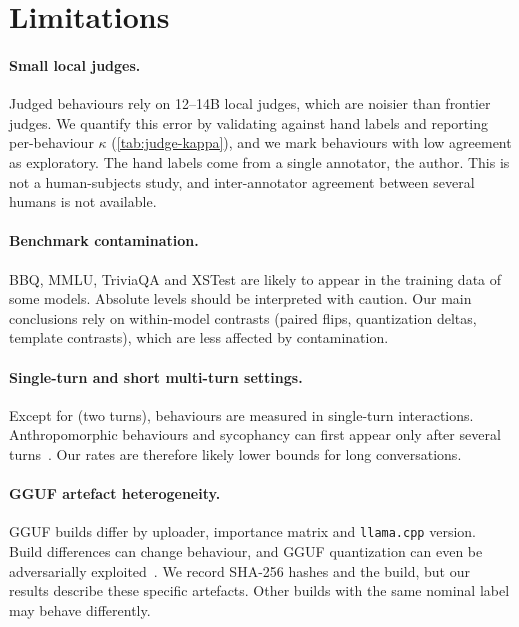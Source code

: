 \section{Limitations}
\label{sec:limitations}

\paragraph{Small local judges.} Judged behaviours rely on 12--14B local judges, which
are noisier than frontier judges. We quantify this error by validating against hand
labels and reporting per-behaviour $\kappa$ (\cref{tab:judge-kappa}), and we mark
behaviours with low agreement as exploratory. The hand labels come from a single
annotator, the author. This is not a human-subjects study, and inter-annotator
agreement between several humans is not available.

\paragraph{Benchmark contamination.} BBQ, MMLU, TriviaQA and XSTest are likely to
appear in the training data of some models. Absolute levels should be interpreted
with caution. Our main conclusions rely on within-model contrasts (paired flips,
quantization deltas, template contrasts), which are less affected by contamination.

\paragraph{Single-turn and short multi-turn settings.} Except for  (two turns),
behaviours are measured in single-turn interactions. Anthropomorphic behaviours and
sycophancy can first appear only after several turns~\citep{ibrahim2025multiturn,hong2025sycon,laban2025lost}.
Our rates are therefore likely lower bounds for long conversations.

\paragraph{GGUF artefact heterogeneity.} GGUF builds differ by uploader, importance
matrix and \texttt{llama.cpp} version. Build differences can change behaviour, and
GGUF quantization can even be adversarially exploited~\citep{egashira2025mindgap}. We
record SHA-256 hashes and the build, but our results describe these specific
artefacts. Other builds with the same nominal label may behave differently.

